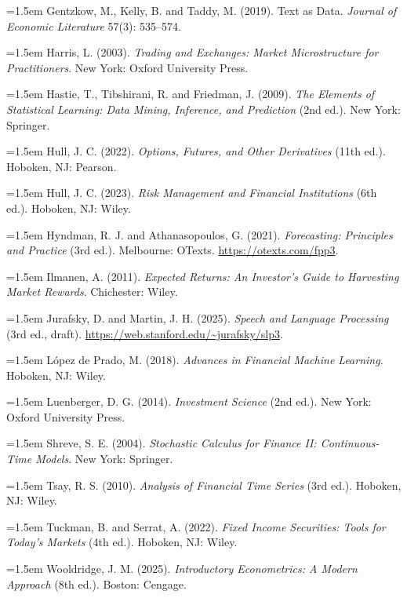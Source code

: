 \hangindent=1.5em Gentzkow, M., Kelly, B. and Taddy, M. (2019). Text as Data. \emph{Journal of Economic Literature} 57(3): 535--574.

\hangindent=1.5em Harris, L. (2003). \emph{Trading and Exchanges: Market Microstructure for Practitioners}. New York: Oxford University Press.

\hangindent=1.5em Hastie, T., Tibshirani, R. and Friedman, J. (2009). \emph{The Elements of Statistical Learning: Data Mining, Inference, and Prediction} (2nd ed.). New York: Springer.

\hangindent=1.5em Hull, J. C. (2022). \emph{Options, Futures, and Other Derivatives} (11th ed.). Hoboken, NJ: Pearson.

\hangindent=1.5em Hull, J. C. (2023). \emph{Risk Management and Financial Institutions} (6th ed.). Hoboken, NJ: Wiley.

\hangindent=1.5em Hyndman, R. J. and Athanasopoulos, G. (2021). \emph{Forecasting: Principles and Practice} (3rd ed.). Melbourne: OTexts. \url{https://otexts.com/fpp3}.

\hangindent=1.5em Ilmanen, A. (2011). \emph{Expected Returns: An Investor's Guide to Harvesting Market Rewards}. Chichester: Wiley.

\hangindent=1.5em Jurafsky, D. and Martin, J. H. (2025). \emph{Speech and Language Processing} (3rd ed., draft). \url{https://web.stanford.edu/~jurafsky/slp3}.

\hangindent=1.5em L\'opez de Prado, M. (2018). \emph{Advances in Financial Machine Learning}. Hoboken, NJ: Wiley.

\hangindent=1.5em Luenberger, D. G. (2014). \emph{Investment Science} (2nd ed.). New York: Oxford University Press.

\hangindent=1.5em Shreve, S. E. (2004). \emph{Stochastic Calculus for Finance II: Continuous-Time Models}. New York: Springer.

\hangindent=1.5em Tsay, R. S. (2010). \emph{Analysis of Financial Time Series} (3rd ed.). Hoboken, NJ: Wiley.

\hangindent=1.5em Tuckman, B. and Serrat, A. (2022). \emph{Fixed Income Securities: Tools for Today's Markets} (4th ed.). Hoboken, NJ: Wiley.

\hangindent=1.5em Wooldridge, J. M. (2025). \emph{Introductory Econometrics: A Modern Approach} (8th ed.). Boston: Cengage.
\par\endgroup
